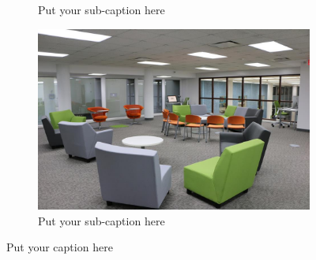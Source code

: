 \begin{figure}[ht]
\begin{subfigure}{.5\textwidth}
  \caption{Put your sub-caption here}
  \label{fig:sub-thirdthird}
\end{subfigure}
\begin{subfigure}{.5\textwidth}
  \centering
  \includegraphics[width=.8\linewidth]{images/2}  
  \caption{Put your sub-caption here}
  \label{fig:sub-fourthfourth}
\end{subfigure}
\caption{Put your caption here}
\label{fig:fig}
\end{figure}
